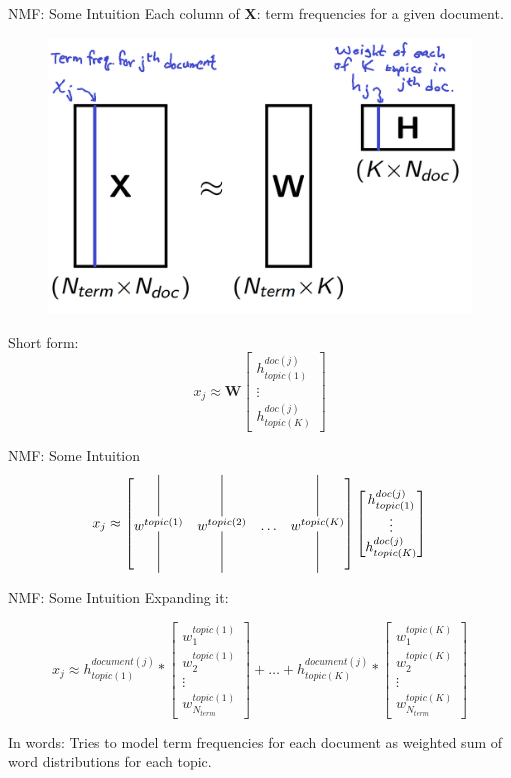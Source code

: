 \documentclass{beamer}
\newcommand{\spike}[2]%
{\bgroup
	\sbox0{#2}%
	\rlap{\usebox0}%
	\hspace{0.5\wd0}%
	\makebox[0pt][c]{\rule[\dimexpr \ht0+1pt]{0.5pt}{#1}}%
	\makebox[0pt][c]{\rule[\dimexpr -\dp0-#1-1pt]{0.5pt}{#1}}%
	\hspace{0.5\wd0}%
	\egroup}
\begin{document}
\begin{frame}{NMF: Some Intuition}
	Each column of \textbf{X}: term frequencies for a given document.
	\begin{figure}
		\begin{center}
			\includegraphics[scale = 0.4]{doctermdecomp}
		\end{center}
	\end{figure}
Short form:
	$$x_j \approx \textbf{W}\begin{bmatrix}
	h^{doc(j)}_{topic(1)} \\
	\vdots \\
	h^{doc(j)}_{topic(K)}
\end{bmatrix}
$$

\end{frame}
\begin{frame}{NMF: Some Intuition}
	\[
x_j \approx \begin{bmatrix}
	\spike{30pt}{$w^{topic(1)}$}  & \spike{30pt}{$w^{topic(2)}$} & \hdots & \spike{30pt}{$w^{topic(K)}$}
\end{bmatrix}
\begin{bmatrix}
	h^{doc(j)}_{topic(1)} \\
	\vdots \\
	h^{doc(j)}_{topic(K)}
\end{bmatrix}
\]
\end{frame}
\begin{frame}{NMF: Some Intuition}
	Expanding it:

$$x_j \approx h_{topic(1)}^{document(j)}*\begin{bmatrix}
	w_{1}^{topic(1)} \\
	w_{2}^{topic(1)} \\
	\vdots \\
	w_{N_{term}}^{topic(1)}
\end{bmatrix} + \hdots + h_{topic(K)}^{document(j)}*\begin{bmatrix}
w_{1}^{topic(K)} \\
w_{2}^{topic(K)} \\
\vdots \\
w_{N_{term}}^{topic(K)}
\end{bmatrix} $$
\begin{block}{In words:}
Tries to model term frequencies for each document as weighted sum of word distributions for each topic.
\end{block}
\end{frame}
\end{document}
